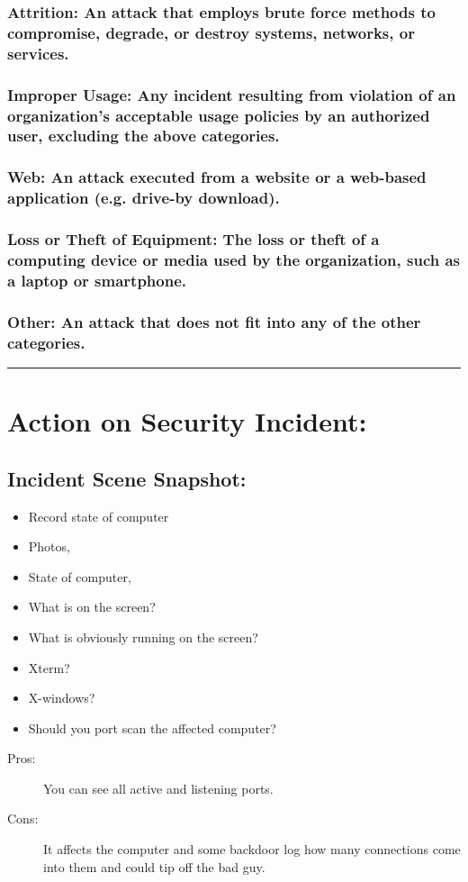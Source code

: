 \documentclass[british]{article}
\begin{document}
\subsubsection{Attrition: An attack that employs brute force methods to compromise,
	degrade, or destroy systems, networks, or services. }

\subsubsection{Improper Usage: Any incident resulting from violation of an organization\textquoteright s
	acceptable usage policies by an authorized user, excluding the above
	categories.}

\subsubsection{Web: An attack executed from a website or a web-based application
	(e.g. drive-by download).}

\subsubsection{Loss or Theft of Equipment: The loss or theft of a computing device
	or media used by the organization, such as a laptop or smartphone.}

\subsubsection{Other: An attack that does not fit into any of the other categories.}

\rule[0.5ex]{0.75\columnwidth}{1pt}

\section{Action on Security Incident:}

\subsection{Incident Scene Snapshot:}
\begin{itemize}
	\item Record state of computer
	\item Photos,
	\item State of computer,
	\item What is on the screen?
	\item What is obviously running on the screen?
	\item Xterm?
	\item X-windows?
	\item Should you port scan the affected computer?
\end{itemize}
\begin{description}
	\item [{Pros:}] You can see all active and listening ports.
	\item [{Cons:}] It affects the computer and some backdoor log how many
	      connections come into them and could tip off the bad guy.
\end{description}
\end{document}

